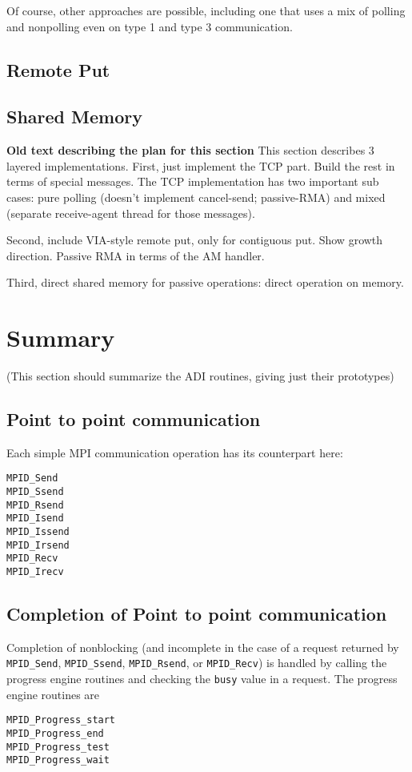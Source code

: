 \documentclass{article}
\def\code#1{\texttt{#1}}
\begin{document}
Of course, other approaches are possible, including one that uses a
mix of polling and nonpolling even on type 1 and type 3 communication.

\subsection{Remote Put}

\subsection{Shared Memory}

\textbf{Old text describing the plan for this section}
This section describes 3 layered implementations.  First, just
implement the TCP part.  Build the rest in terms of special messages.
The TCP implementation has two important sub cases: pure polling
(doesn't implement cancel-send; passive-RMA) 
and mixed (separate receive-agent thread for those messages).  

Second, include VIA-style remote put, only for contiguous put.  Show
growth direction.  Passive RMA in terms of the AM handler.

Third, direct shared memory for passive operations: direct operation
on memory.

\section{Summary}
\label{sec:adi-summary}
(This section should summarize the ADI routines, giving just their prototypes)

\subsection{Point to point communication}
Each simple MPI communication operation has its counterpart here:
\begin{verbatim}
MPID_Send
MPID_Ssend
MPID_Rsend
MPID_Isend
MPID_Issend
MPID_Irsend
MPID_Recv
MPID_Irecv
\end{verbatim}

\subsection{Completion of Point to point communication}
Completion of nonblocking (and incomplete in the case of a request
returned by \code{MPID_Send}, \code{MPID_Ssend}, \code{MPID_Rsend}, or
\code{MPID_Recv}) is handled by calling the progress engine routines
and checking the \code{busy} value in a request.  The progress engine
routines are
\begin{verbatim}
MPID_Progress_start
MPID_Progress_end
MPID_Progress_test
MPID_Progress_wait
\end{verbatim}
\end{document}
